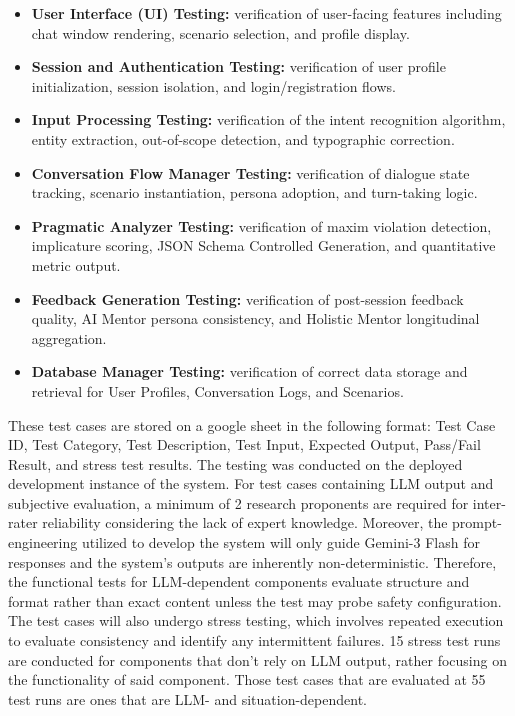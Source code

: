 \begin{itemize}
  \item \textbf{User Interface (UI) Testing:} verification of user-facing features including chat window rendering, scenario selection, and profile display.
  \item \textbf{Session and Authentication Testing:} verification of user profile initialization, session isolation, and login/registration flows.
  \item \textbf{Input Processing Testing:} verification of the intent recognition algorithm, entity extraction, out-of-scope detection, and typographic correction.
  \item \textbf{Conversation Flow Manager Testing: } verification of dialogue state tracking, scenario instantiation, persona adoption, and turn-taking logic.
  \item \textbf{Pragmatic Analyzer Testing:} verification of maxim violation detection, implicature scoring, JSON Schema Controlled Generation, and quantitative metric output.
  \item \textbf{Feedback Generation Testing:} verification of post-session feedback quality, AI Mentor persona consistency, and Holistic Mentor longitudinal aggregation.
  \item \textbf{Database Manager Testing:} verification of correct data storage and retrieval for User Profiles, Conversation Logs, and Scenarios.
\end{itemize}
 
These test cases are stored on a google sheet in the following format: Test Case ID, Test Category, Test Description, Test Input, Expected Output, Pass/Fail Result, and stress test results. The testing
was conducted on the deployed development instance of the system. For test cases containing LLM output and subjective evaluation, a minimum of 2 research proponents are 
required for inter-rater reliability considering the lack of expert knowledge. Moreover, the prompt-engineering utilized to develop the system will only guide Gemini-3 Flash for responses and the system's outputs are inherently non-deterministic.
Therefore, the functional tests for LLM-dependent components evaluate structure and format rather than exact content unless the test may probe safety configuration. The test cases will also undergo
stress testing, which involves repeated execution to evaluate consistency and identify any intermittent failures. 15 stress test runs are conducted for components that don't rely on LLM output, rather focusing
on the functionality of said component. Those test cases that are evaluated at 55 test runs are ones that are LLM- and situation-dependent.
 
